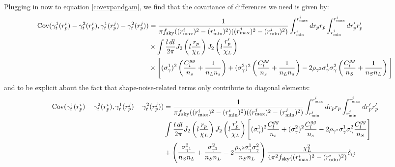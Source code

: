 \documentclass[onecolumn,amsmath,aps,fleqn, superscriptaddress]{revtex4}
\begin{document}
Plugging in now to equation \ref{covexpandgam}, we find that the covariance of differences we need is given by:
\begin{align}
{\rm Cov}(\gamma_t^1(r_p^i) - \gamma_t^2(r_p^i), \gamma_t^1(r_p^j) - \gamma_t^2(r_p^j))&= \frac{1}{\pi f_{\rm sky}((r^i_{\rm max})^2 - (r^i_{\rm min})^2)((r^j_{\rm max})^2 - (r^j_{\rm min})^2)}  \int_{r^i_{\rm min}}^{r^i_{\rm max}} dr_p r_p \int_{r^j_{\rm min}}^{r^j_{\rm max}} dr_p^\prime r_p^\prime \nonumber \\ &\times \int \frac{l \, dl}{2\pi} J_2\left(l \frac{r_p}{\chi_L}\right) J_2 \left(l \frac{r_p^\prime}{\chi_L}\right) \nonumber \\ &\times \Bigg[(\sigma_{\gamma}^{1})^2\left(\frac{C_l^{gg}}{n_s} + \frac{1}{n_L n_s}\right) + (\sigma_{\gamma}^{2})^2\left(\frac{C_l^{gg}}{n_s} + \frac{1}{n_L n_s}\right)- 2\rho_{\gamma^2} \sigma_{\gamma}^{1}\sigma_{\gamma}^{2} \left(\frac{C_l^{gg}}{n_S} + \frac{1}{n_S n_L} \right)  \Bigg]
\label{cov_diff}
\end{align}
and to be explicit about the fact that shape-noise-related terms only contribute to diagonal elements:
\begin{align}
{\rm Cov}(\gamma_t^1(r_p^i) - \gamma_t^2(r_p^i), \gamma_t^1(r_p^j) - \gamma_t^2(r_p^j))&= \frac{1}{\pi f_{\rm sky}((r^i_{\rm max})^2 - (r^i_{\rm min})^2)((r^j_{\rm max})^2 - (r^j_{\rm min})^2)}  \int_{r^i_{\rm min}}^{r^i_{\rm max}} dr_p r_p \int_{r^j_{\rm min}}^{r^j_{\rm max}} dr_p^\prime r_p^\prime\nonumber \\ & \int \frac{l \, dl}{2\pi} J_2\left(l \frac{r_p}{\chi_L}\right) J_2 \left(l \frac{r_p^\prime}{\chi_L}\right) \Bigg[(\sigma_{\gamma}^{1})^2 \frac{C_l^{gg}}{n_s} + (\sigma_{\gamma}^{2})^2\frac{C_l^{gg}}{n_s} - 2\rho_{\gamma^2} \sigma_{\gamma}^{1}\sigma_{\gamma}^{2}\frac{C_l^{gg}}{n_S}  \Bigg]  \nonumber \\ &+\left(\frac{\sigma_{\gamma^1}^2}{n_S n_L} +\frac{\sigma_{\gamma^2}^2}{n_S n_L} - 2 \frac{\rho_{\gamma^2} \sigma_{\gamma}^{1}\sigma_{\gamma}^{2}}{n_Sn_L}\right)\frac{\chi_L^2}{4\pi^2 f_{\rm sky}((r^i_{\rm max})^2 - (r^i_{\rm min})^2)}\delta_{ij}
\label{cov_diff_exp}
\end{align}





\end{document}
